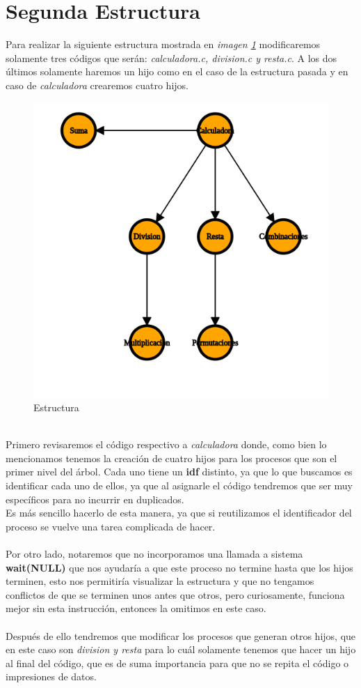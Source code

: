 \documentclass[10pt]{article}
\begin{document}
	\section{Segunda Estructura}
	Para realizar la siguiente estructura mostrada en \emph{imagen  \ref{fig:est2}} modificaremos solamente tres códigos que serán: \emph{calculadora.c, division.c y resta.c}. 
	A los dos últimos solamente haremos un hijo como en el caso de la estructura pasada y en caso de \emph{calculadora} crearemos cuatro hijos. 
	\begin{figure}[h!]
		\centering
		\includegraphics[width=0.5\linewidth]{graph2.png}
		\caption{Estructura}
		\label{fig:est2}
	\end{figure}
	\\
	Primero revisaremos el código respectivo a \emph{calculadora} donde, como bien lo mencionamos tenemos la creación de cuatro hijos para los procesos que son el primer nivel del árbol. Cada uno tiene un \textbf{idf} distinto, ya que lo que buscamos es identificar cada uno de ellos, ya que al asignarle el código tendremos que ser muy específicos para no incurrir en duplicados. 
	\\
	Es más sencillo hacerlo de esta manera, ya que si reutilizamos el identificador del proceso se vuelve una tarea complicada de hacer.
	\\\\
	Por otro lado, notaremos que no incorporamos una llamada a sistema \textbf{wait(NULL)} que nos ayudaría a que este proceso no termine hasta que los hijos terminen, esto nos permitiría visualizar la estructura y que no tengamos conflictos de que se terminen unos antes que otros, pero curiosamente, funciona mejor sin esta instrucción, entonces la omitimos en este caso.
	\\\\
	Después de ello tendremos que modificar los procesos que generan otros hijos, que en este caso son \emph{division y resta} para lo cuál solamente tenemos que hacer un hijo al final del código, que es de suma importancia para que no se repita el código o impresiones de datos. 
\end{document}
